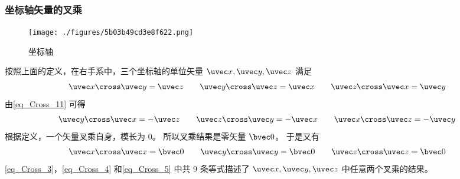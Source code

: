 \subsubsection{坐标轴矢量的叉乘}
\begin{figure}[ht]
\centering
\texttt{[image: ./figures/5b03b49cd3e8f622.png]}
\caption{坐标轴} \label{fig_Cross_3}
\end{figure}
按照上面的定义，在右手系中，三个坐标轴的单位矢量 $\uvec x, \uvec y, \uvec z$ 满足
\begin{equation}\label{eq_Cross_3}
\uvec x \cross \uvec y = \uvec z
\qquad
\uvec y \cross \uvec z = \uvec x
\qquad
\uvec z \cross \uvec x = \uvec y~
\end{equation}
由\autoref{eq_Cross_11} 可得
\begin{equation}\label{eq_Cross_4}
\uvec y \cross \uvec x =  - \uvec z
\qquad
\uvec z \cross \uvec y =  - \uvec x
\qquad
\uvec x \cross \uvec z =  - \uvec y~
\end{equation}
根据定义，一个矢量叉乘自身，模长为 $0$。 所以叉乘结果是零矢量 $\bvec 0$。 于是又有
\begin{equation}\label{eq_Cross_5}
\uvec x \cross \uvec x = \bvec 0
\qquad
\uvec y \cross \uvec y = \bvec 0
\qquad
\uvec z \cross \uvec z = \bvec 0~
\end{equation}
\autoref{eq_Cross_3}，\autoref{eq_Cross_4} 和\autoref{eq_Cross_5} 中共 9 条等式描述了 $\uvec x, \uvec y, \uvec z$ 中任意两个叉乘的结果。

